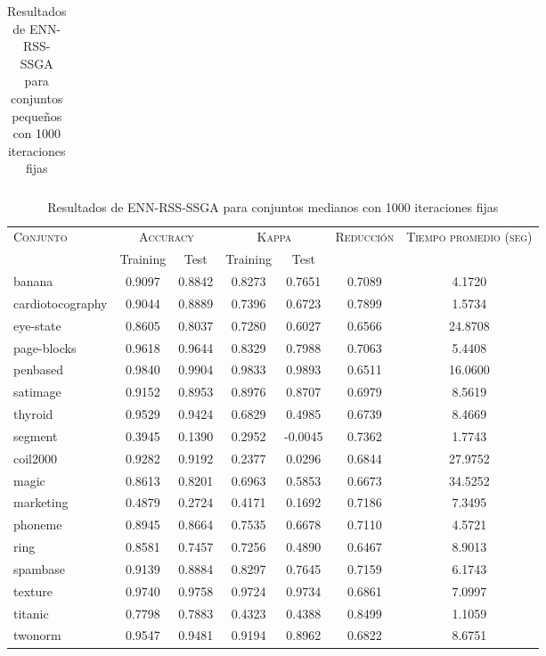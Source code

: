 \begin{table}[]
\begin{tabular}{l c c c c c c}
\hline
\end{tabular}
\caption{Resultados de ENN-RSS-SSGA para conjuntos pequeños con 1000 iteraciones fijas}
\label{res-peq-ENN-RSS-ssga}
\end{table}


\begin{table}[]
\centering
\begin{tabular}{l c c c c c c}
\hline
\multirow{2}{*}{\textsc{Conjunto}}
	& \multicolumn{2}{c}{\textsc{Accuracy}}
	& \multicolumn{2}{c}{\textsc{Kappa}}
	& \textsc{Reducción}
	& \textsc{Tiempo promedio (seg)} \\
	& Training & Test
	& Training & Test \\ 
\hline
\hline

banana & 0.9097 & 0.8842 & 0.8273 & 0.7651 & 0.7089 & 4.1720 \\
cardiotocography & 0.9044 & 0.8889 & 0.7396 & 0.6723 & 0.7899 & 1.5734 \\
eye-state & 0.8605 & 0.8037 & 0.7280 & 0.6027 & 0.6566 &  24.8708 \\
page-blocks & 0.9618 & 0.9644 & 0.8329 & 0.7988 & 0.7063 & 5.4408 \\
penbased & 0.9840 & 0.9904 & 0.9833 & 0.9893 & 0.6511 & 16.0600 \\
satimage & 0.9152 & 0.8953 & 0.8976 & 0.8707 & 0.6979 & 8.5619 \\
thyroid & 0.9529 & 0.9424 & 0.6829 & 0.4985 & 0.6739 & 8.4669 \\
segment & 0.3945 & 0.1390 & 0.2952 & -0.0045 & 0.7362 & 1.7743 \\
coil2000 & 0.9282 & 0.9192 & 0.2377 & 0.0296 & 0.6844 &  27.9752 \\
magic & 0.8613 & 0.8201 & 0.6963 & 0.5853 & 0.6673 &  34.5252 \\
marketing & 0.4879 & 0.2724 & 0.4171 & 0.1692 & 0.7186 & 7.3495 \\
phoneme & 0.8945 & 0.8664 & 0.7535 & 0.6678 & 0.7110 & 4.5721 \\
ring & 0.8581 & 0.7457 & 0.7256 & 0.4890 & 0.6467 & 8.9013 \\
spambase & 0.9139 & 0.8884 & 0.8297 & 0.7645 & 0.7159 & 6.1743 \\
texture & 0.9740 & 0.9758 & 0.9724 & 0.9734 & 0.6861 & 7.0997 \\
titanic & 0.7798 & 0.7883 & 0.4323 & 0.4388 & 0.8499 & 1.1059 \\
twonorm & 0.9547 & 0.9481 & 0.9194 & 0.8962 & 0.6822 & 8.6751 \\

\hline
\end{tabular}
\caption{Resultados de ENN-RSS-SSGA para conjuntos medianos con 1000 iteraciones fijas}
\label{res-med-ENN-RSS-ssga}
\end{table}



